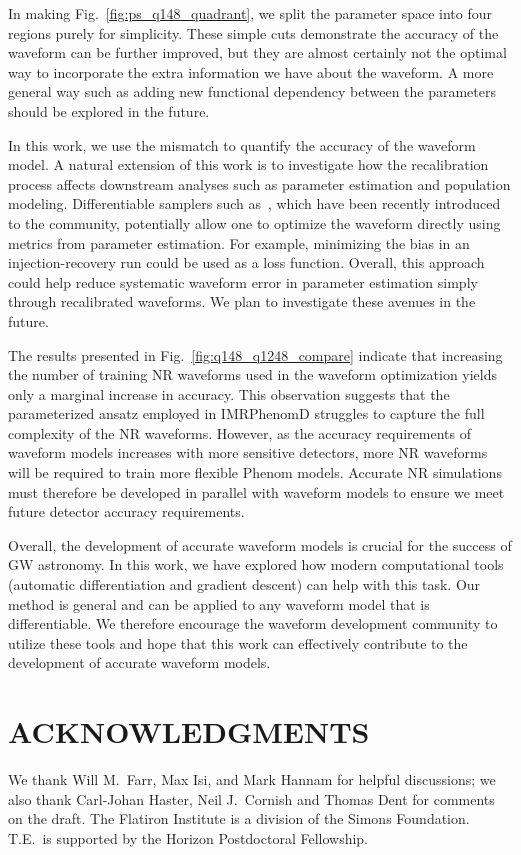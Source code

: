 \documentclass[twocolumn]{aastex631}
\begin{document}
In making Fig.~\ref{fig:ps_q148_quadrant}, we split the parameter space into four regions purely for simplicity.
These simple cuts demonstrate the accuracy of the waveform can be further improved,
but they are almost certainly not the optimal way to incorporate the extra information
we have about the waveform. A more general way such as adding new functional dependency
between the parameters should be explored in the future.

In this work, we use the mismatch to quantify the accuracy of the waveform model. 
A natural extension of this work is to investigate how the recalibration process affects
downstream analyses such as parameter estimation and population modeling.
Differentiable samplers such as~\citep{Wong:2022xvh}, which have been recently
introduced to the community, potentially allow one to optimize the waveform directly
using metrics from parameter estimation. For example, minimizing the bias in an injection-recovery run
could be used as a loss function. Overall, this approach could help reduce systematic waveform error
in parameter estimation simply through recalibrated waveforms. We plan to investigate these avenues in
the future.

The results presented in Fig.~\ref{fig:q148_q1248_compare} indicate that
increasing the number of training NR waveforms used in the waveform optimization yields
only a marginal increase in accuracy. This observation suggests that the parameterized ansatz employed 
in IMRPhenomD struggles to capture the full complexity of the NR waveforms. 
However, as the accuracy requirements of waveform models increases with more sensitive detectors,
more NR waveforms will be required to train more flexible Phenom models. 
Accurate NR simulations must therefore be developed in parallel with waveform models
to ensure we meet future detector accuracy requirements.

Overall, the development of accurate waveform models is crucial for the success of GW astronomy.
In this work, we have explored how modern computational tools (automatic differentiation and gradient descent)
can help with this task. 
Our method is general and can be applied to any waveform model that is differentiable.
We therefore encourage the waveform development community to utilize these tools
and hope that this work can effectively contribute to the development of accurate waveform models.



\section{ACKNOWLEDGMENTS}

We thank Will M.~Farr, Max Isi, and Mark Hannam for helpful discussions; we also
thank Carl-Johan Haster, Neil J.~Cornish and Thomas Dent for comments on the
draft. The Flatiron Institute is a division of the Simons Foundation. T.E.\ is
supported by the Horizon Postdoctoral Fellowship.

\end{document}

